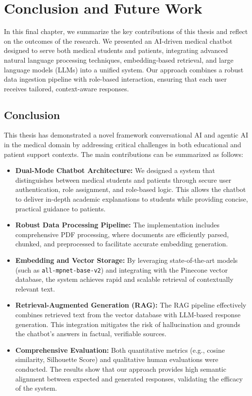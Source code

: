 \chapter{Conclusion and Future Work}

\label{Chapter6}

In this final chapter, we summarize the key contributions of this thesis and reflect on the outcomes of the research. We presented an AI-driven medical chatbot designed to serve both medical students and patients, integrating advanced natural language processing techniques, embedding-based retrieval, and large language models (LLMs) into a unified system. Our approach combines a robust data ingestion pipeline with role-based interaction, ensuring that each user receives tailored, context-aware responses. 

\section{Conclusion}
This thesis has demonstrated a novel framework  conversational AI and agentic AI in the medical domain by addressing critical challenges in both educational and patient support contexts. The main contributions can be summarized as follows:
\begin{itemize}
    \item \textbf{Dual-Mode Chatbot Architecture:} We designed a system that distinguishes between medical students and patients through secure user authentication, role assignment, and role-based logic. This allows the chatbot to deliver in-depth academic explanations to students while providing concise, practical guidance to patients.
    \item \textbf{Robust Data Processing Pipeline:} The implementation includes comprehensive PDF processing, where documents are efficiently parsed, chunked, and preprocessed to facilitate accurate embedding generation.
    \item \textbf{Embedding and Vector Storage:} By leveraging state-of-the-art models (such as \texttt{all-mpnet-base-v2}) and integrating with the Pinecone vector database, the system achieves rapid and scalable retrieval of contextually relevant text.
    \item \textbf{Retrieval-Augmented Generation (RAG):} The RAG pipeline effectively combines retrieved text from the vector database with LLM-based response generation. This integration mitigates the risk of hallucination and grounds the chatbot's answers in factual, verifiable sources.
    \item \textbf{Comprehensive Evaluation:} Both quantitative metrics (e.g., cosine similarity, Silhouette Score) and qualitative human evaluations were conducted. The results show that our approach provides high semantic alignment between expected and generated responses, validating the efficacy of the system.
\end{itemize}

